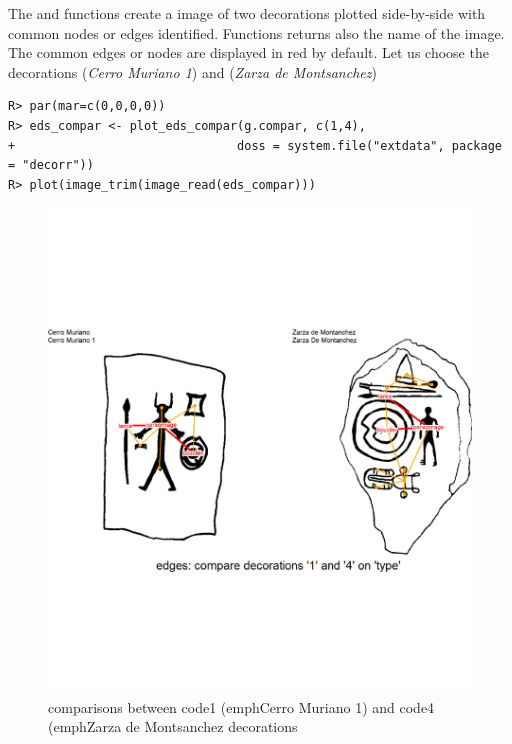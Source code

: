 \documentclass[article]{jss}\usepackage{knitr}
\begin{document}
The and  functions create a  image of two decorations plotted side-by-side with common nodes or edges identified. Functions returns also the name of the image. The common edges or nodes are displayed in red by default. Let us choose the decorations  (\emph{Cerro Muriano 1}) and  (\emph{Zarza de Montsanchez})

\begin{kframe}
\begin{verbatim}
R> par(mar=c(0,0,0,0))
R> eds_compar <- plot_eds_compar(g.compar, c(1,4),
+                               doss = system.file("extdata", package = "decorr"))
R> plot(image_trim(image_read(eds_compar)))
\end{verbatim}
\end{kframe}\begin{figure}[H]

{\centering \includegraphics[width=\maxwidth]{figure/unnamed-chunk-12-1} 

}

\caption{\label{fig:figs}comparisons between code{1} (emph{Cerro Muriano 1}) and code{4} (emph{Zarza de Montsanchez} decorations}\label{fig:unnamed-chunk-12}
\end{figure}
\end{document}
